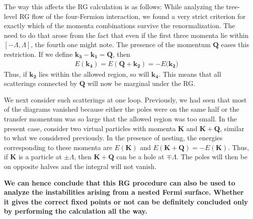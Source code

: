 \documentclass[14pt]{extarticle}
\begin{document}
The way this affects the RG calculation is as follows: While analyzing the tree-level RG flow of the four-Fermion interaction, we found a very strict criterion for exactly which of the momenta combinations survive the renormalization. The need to do that arose from the fact that even if the first three momenta lie within \([-\Lambda,\Lambda]\), the fourth one might note. The presence of the momentum \(\mathbf{Q}\) eases this restriction. If we define \(\mathbf{k_3} - \mathbf{k_1} = \mathbf{Q}\), then 
\begin{equation}\begin{aligned}
E(\mathbf{k_4}) = E(\mathbf{Q + k_2}) = -E(\mathbf{k_2)}
\end{aligned}\end{equation}
Thus, if \(\mathbf{k_2}\) lies within the allowed region, so will \(\mathbf{k_4}\). This means that all scatterings connected by \(\mathbf{Q}\) will now be marginal under the RG. 
 
We next consider such scatterings at one loop. Previously, we had seen that most of the diagrams vanished because either the poles were on the same half or the transfer momentum was so large that the allowed region was too small. In the present case, consider two virtual particles with momenta \(\mathbf{K}\) and \(\mathbf{K+Q}\), similar to what we considered previously. In the presence of nesting, the energies corresponding to these momenta are \(E(\mathbf{K})\) and \(E(\mathbf{K+Q}) = -E(\mathbf{K})\). Thus, if \(\mathbf{K}\) is a particle at \(\pm \Lambda\), then \(\mathbf{K+Q}\) can be a hole at \(\mp \Lambda\). The poles will then be on opposite halves and the integral will not vanish.
 
\textbf{We can hence conclude that this RG procedure can also be used to analyze the instabilities arising from a nested Fermi surface. Whether it gives the correct fixed points or not can be definitely concluded only by performing the calculation all the way.}
\end{document}
